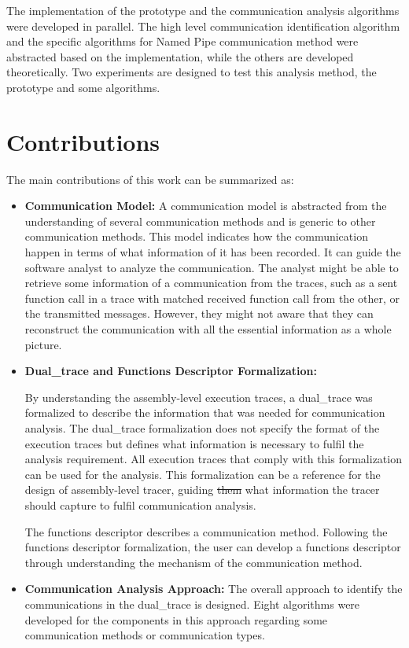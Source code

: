 \documentclass[12pt,oneside]{book}
\providecommand{\DIFdeltex}[1]{{\protect\color{red}\sout{#1}}}                      %
\providecommand{\DIFdelbegin}{} %
\providecommand{\DIFdelend}{} %
\providecommand{\DIFdel}[1]{\texorpdfstring{\DIFdeltex{#1}}{}} %
\newcommand{\DIFscaledelfig}{0.5}
\newlength{\DIFdelgraphicswidth} %
\newlength{\DIFdelgraphicsheight} %
\newcommand{\DIFdelincludegraphics}[2][]{%
\sbox{\DIFdelgraphicsbox}{\DIFOincludegraphics[#1]{#2}}%
\settoboxwidth{\DIFdelgraphicswidth}{\DIFdelgraphicsbox} %
\settoboxtotalheight{\DIFdelgraphicsheight}{\DIFdelgraphicsbox} %
\scalebox{\DIFscaledelfig}{%
\parbox[b]{\DIFdelgraphicswidth}{\usebox{\DIFdelgraphicsbox}\\[-\baselineskip] \rule{\DIFdelgraphicswidth}{0em}}\llap{\resizebox{\DIFdelgraphicswidth}{\DIFdelgraphicsheight}{%
\setlength{\unitlength}{\DIFdelgraphicswidth}%
\begin{picture}(1,1)%
\thicklines\linethickness{2pt} %
{\color[rgb]{1,0,0}\put(0,0){\framebox(1,1){}}}%
{\color[rgb]{1,0,0}\put(0,0){\line( 1,1){1}}}%
{\color[rgb]{1,0,0}\put(0,1){\line(1,-1){1}}}%
\end{picture}%
}\hspace*{3pt}}} %
} %
\DeclareRobustCommand{\DIFdelbegin}{\DIFOdelbegin \let\includegraphics\DIFdelincludegraphics} %
\DeclareRobustCommand{\DIFdelend}{\DIFOaddend \let\includegraphics\DIFOincludegraphics} %
\begin{document}
The implementation of the prototype and the communication analysis algorithms were developed in parallel. The high level communication identification algorithm and the specific algorithms for Named Pipe communication method were abstracted based on the implementation, while the others are developed theoretically. Two experiments are designed to test this analysis method, the prototype and some algorithms. 


\section{Contributions}
The main contributions of this work can be summarized as:
\begin{itemize}
  \item \textbf{Communication Model:} A communication model is abstracted from the understanding of several communication methods and is generic to other communication methods. This model indicates how the communication happen in terms of what information of it has been recorded. It can guide the software analyst to analyze the communication. The analyst might be able to retrieve some information of a communication from the traces, such as a sent function call in a trace with matched received function call from the other, or the transmitted messages. However, they might not aware that they can reconstruct the communication with all the essential information as a whole picture.

  \item \textbf{Dual\_trace and Functions Descriptor Formalization:} 

By understanding the assembly-level execution traces, a dual\_trace was formalized to describe the information that was needed for communication analysis. The dual\_trace formalization does not specify the format of the execution traces but defines what information is necessary to fulfil the analysis requirement. All execution traces that comply with this formalization can be used for the analysis. This formalization can be a reference for the design of assembly-level tracer, guiding \DIFdelbegin \DIFdel{them }\DIFdelend what information the tracer should capture to fulfil communication analysis.

The functions descriptor describes a communication method. Following the functions descriptor formalization, the user can develop a functions descriptor through understanding the mechanism of the communication method.

  \item \textbf{Communication Analysis Approach:} The overall approach to identify the communications in the dual\_trace is designed. Eight algorithms were developed for the components in this approach regarding some communication methods or communication types. 


\end{itemize}
\end{document}
